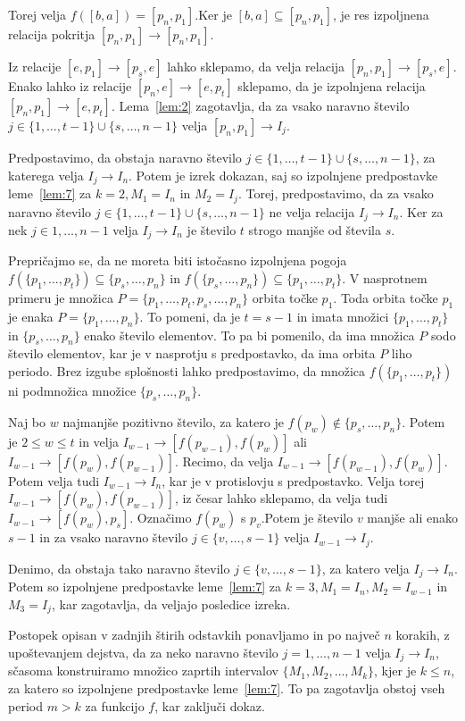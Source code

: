 \documentclass[../TG_magistrsko_delo_sections.tex]{subfiles}
\begin{document}
\begin{dokaz}
Torej velja $f([b, a]) = [p_n, p_1]$.Ker je $[b, a] \subseteq [p_n, p_1]$, je res izpoljnena relacija pokritja $[p_n, p_1] \to [p_n, p_1]$.

Iz relacije $[e, p_1] \to [p_s, e]$ lahko sklepamo, da velja relacija $[p_n, p_1] \to [p_s, e]$. Enako lahko iz relacije $[p_n, e] \to [e, p_t]$ sklepamo, da je izpolnjena relacija $[p_n, p_1] \to [e, p_t]$. Lema~\ref{lem:2} zagotavlja, da za vsako naravno število $j \in \{1, \dots, t-1\} \cup \{s, \dots, n-1\}$ velja $[p_n, p_1] \to I_j$.

Predpostavimo, da obstaja naravno število $j \in \{1, \dots, t-1\} \cup \{s, \dots, n-1\}$, za katerega velja $I_j \to I_n$. Potem je izrek dokazan, saj so izpolnjene predpostavke leme~\ref{lem:7} za $k=2, M_1 = I_n$ in $M_2=I_j$. Torej, predpostavimo, da za vsako naravno število $j \in \{1, \dots, t-1\} \cup \{s, \dots, n-1\}$ ne velja relacija $I_j \to I_n$. Ker za nek $j \in {1, \dots, n-1}$ velja $I_j \to I_n$ je število $t$ strogo manjše od števila $s$.

Prepričajmo se, da ne moreta biti istočasno izpolnjena pogoja $f(\{p_1, \dots, p_t\}) \subseteq \{p_s, \dots, p_n\}$ in $f(\{p_s, \dots, p_n\}) \subseteq \{p_1, \dots, p_t\}$. V nasprotnem primeru je množica $P = \{p_1, \dots, p_t, p_s, \dots, p_n\}$ orbita točke $p_1$. Toda orbita točke $p_1$ je enaka $P = \{p_1, \dots, p_n\}$. To pomeni, da je $t = s-1$ in imata množici $\{p_1, \dots, p_t\}$ in $\{p_s, \dots, p_n\}$ enako število elementov. To pa bi pomenilo, da ima množica $P$ sodo število elementov, kar je v nasprotju s predpostavko, da ima orbita $P$ liho periodo. Brez izgube splošnosti lahko predpostavimo, da množica $f(\{p_1, \dots, p_t \})$ ni podmnožica množice $\{p_s, \dots, p_n\}$.

Naj bo $w$ najmanjše pozitivno število, za katero je $f(p_w) \notin \{p_s, \dots, p_n\}$. Potem je $2 \leq w \leq t$ in velja $I_{w-1} \to [f(p_{w-1}), f(p_w)]$ ali $I_{w-1} \to [f(p_w), f(p_{w-1})]$. Recimo, da velja $I_{w-1} \to [f(p_{w-1}), f(p_w)]$. Potem velja tudi $I_{w-1} \to I_n$, kar je v protislovju s predpostavko. Velja torej $I_{w-1} \to [f(p_w), f(p_{w-1})]$, iz česar lahko sklepamo, da velja tudi $I_{w-1} \to [f(p_w), p_s]$. Označimo $f(p_w)$ s $p_v$.Potem je število $v$ manjše ali enako $s-1$ in za vsako naravno število $j \in \{v, \dots, s-1 \}$ velja $I_{w-1} \to I_j$.

Denimo, da obstaja tako naravno število $j \in \{v, \dots, s-1 \}$, za katero velja $I_j \to I_n$. Potem so izpolnjene predpostavke leme~\ref{lem:7} za $k=3, M_1 = I_n, M_2 = I_{w-1}$ in $M_3 = I_j$, kar zagotavlja, da veljajo posledice izreka.

Postopek opisan v zadnjih štirih odstavkih ponavljamo in po največ $n$ korakih, z upoštevanjem dejstva, da za neko naravno število $j = 1, \dots, n-1$ velja $I_j \to I_n$, sčasoma konstruiramo množico zaprtih intervalov $\{M_1, M_2, \dots, M_k\}$, kjer je $k \leq n$, za katero so izpolnjene predpostavke leme~\ref{lem:7}. To pa zagotavlja obstoj vseh period $m > k$ za funkcijo $f$, kar zaključi dokaz.
\end{dokaz}
\end{document}
